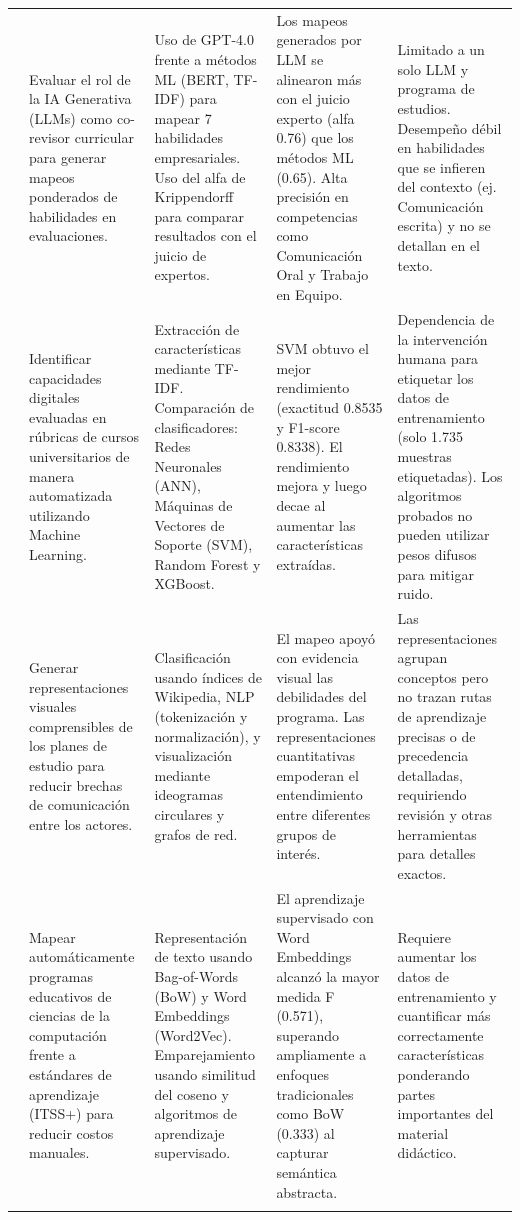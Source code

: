 \begin{landscape}
\begin{xltabular}{\linewidth}{p{2.2cm} X X X X}
    \citep{cristea_artificial_2025} & 
    Evaluar el rol de la IA Generativa (LLMs) como co-revisor curricular para generar mapeos ponderados de habilidades en evaluaciones. & 
    Uso de GPT-4.0 frente a métodos ML (BERT, TF-IDF) para mapear 7 habilidades empresariales. Uso del alfa de Krippendorff para comparar resultados con el juicio de expertos. & 
    Los mapeos generados por LLM se alinearon más con el juicio experto (alfa 0.76) que los métodos ML (0.65). Alta precisión en competencias como Comunicación Oral y Trabajo en Equipo. & 
    Limitado a un solo LLM y programa de estudios. Desempeño débil en habilidades que se infieren del contexto (ej. Comunicación escrita) y no se detallan en el texto. \\
    \addlinespace
    
    \citep{fan_identifying_2023} & 
    Identificar capacidades digitales evaluadas en rúbricas de cursos universitarios de manera automatizada utilizando Machine Learning. & 
    Extracción de características mediante TF-IDF. Comparación de clasificadores: Redes Neuronales (ANN), Máquinas de Vectores de Soporte (SVM), Random Forest y XGBoost. & 
    SVM obtuvo el mejor rendimiento (exactitud 0.8535 y F1-score 0.8338). El rendimiento mejora y luego decae al aumentar las características extraídas. & 
    Dependencia de la intervención humana para etiquetar los datos de entrenamiento (solo 1.735 muestras etiquetadas). Los algoritmos probados no pueden utilizar pesos difusos para mitigar ruido. \\
    \addlinespace
    
    \citep{duarte_broader_2023} & 
    Generar representaciones visuales comprensibles de los planes de estudio para reducir brechas de comunicación entre los actores. & 
    Clasificación usando índices de Wikipedia, NLP (tokenización y normalización), y visualización mediante ideogramas circulares y grafos de red. & 
    El mapeo apoyó con evidencia visual las debilidades del programa. Las representaciones cuantitativas empoderan el entendimiento entre diferentes grupos de interés. & 
    Las representaciones agrupan conceptos pero no trazan rutas de aprendizaje precisas o de precedencia detalladas, requiriendo revisión y otras herramientas para detalles exactos. \\
    \addlinespace
    
    \citep{miura_automated_2021} & 
    Mapear automáticamente programas educativos de ciencias de la computación frente a estándares de aprendizaje (ITSS+) para reducir costos manuales. & 
    Representación de texto usando Bag-of-Words (BoW) y Word Embeddings (Word2Vec). Emparejamiento usando similitud del coseno y algoritmos de aprendizaje supervisado. & 
    El aprendizaje supervisado con Word Embeddings alcanzó la mayor medida F (0.571), superando ampliamente a enfoques tradicionales como BoW (0.333) al capturar semántica abstracta. & 
    Requiere aumentar los datos de entrenamiento y cuantificar más correctamente características ponderando partes importantes del material didáctico. \\
    \addlinespace
    

\end{xltabular}
\end{landscape}
